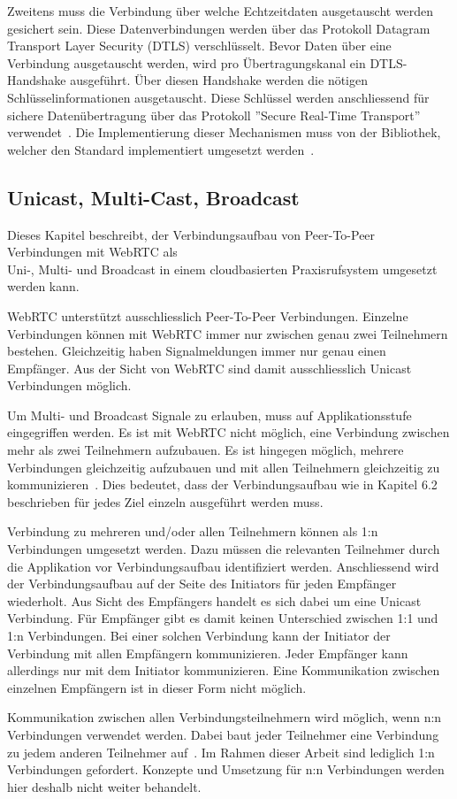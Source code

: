 Zweitens muss die Verbindung über welche Echtzeitdaten ausgetauscht werden gesichert sein.
Diese Datenverbindungen werden über das Protokoll Datagram Transport Layer Security (DTLS) verschlüsselt.
Bevor Daten über eine Verbindung ausgetauscht werden, wird pro Übertragungskanal ein DTLS-Handshake ausgeführt.
Über diesen Handshake werden die nötigen Schlüsselinformationen ausgetauscht.
Diese Schlüssel werden anschliessend für sichere Datenübertragung über das Protokoll ''Secure Real-Time Transport'' verwendet~\cite{rfc_8827_webRTC_SecurityArchitecture}.
Die Implementierung dieser Mechanismen muss von der Bibliothek, welcher den Standard implementiert umgesetzt werden~\cite{webrtc_spec}.

\subsection{Unicast, Multi-Cast, Broadcast}

Dieses Kapitel beschreibt, der Verbindungsaufbau von Peer-To-Peer Verbindungen mit WebRTC als \\Uni-, Multi- und Broadcast in einem cloudbasierten Praxisrufsystem umgesetzt werden kann.

WebRTC unterstützt ausschliesslich Peer-To-Peer Verbindungen.
Einzelne Verbindungen können mit WebRTC immer nur zwischen genau zwei Teilnehmern bestehen.
Gleichzeitig haben Signalmeldungen immer nur genau einen Empfänger.
Aus der Sicht von WebRTC sind damit ausschliesslich Unicast Verbindungen möglich.

Um Multi- und Broadcast Signale zu erlauben, muss auf Applikationsstufe eingegriffen werden.
Es ist mit WebRTC nicht möglich, eine Verbindung zwischen mehr als zwei Teilnehmern aufzubauen.
Es ist hingegen möglich, mehrere Verbindungen gleichzeitig aufzubauen und mit allen Teilnehmern gleichzeitig zu kommunizieren~\cite{webrtc_mesh}.
Dies bedeutet, dass der Verbindungsaufbau wie in Kapitel 6.2 beschrieben für jedes Ziel einzeln ausgeführt werden muss.

Verbindung zu mehreren und/oder allen Teilnehmern können als 1:n Verbindungen umgesetzt werden.
Dazu müssen die relevanten Teilnehmer durch die Applikation vor Verbindungsaufbau identifiziert werden.
Anschliessend wird der Verbindungsaufbau auf der Seite des Initiators für jeden Empfänger wiederholt.
Aus Sicht des Empfängers handelt es sich dabei um eine Unicast Verbindung.
Für Empfänger gibt es damit keinen Unterschied zwischen 1:1 und 1:n Verbindungen.
Bei einer solchen Verbindung kann der Initiator der Verbindung mit allen Empfängern kommunizieren.
Jeder Empfänger kann allerdings nur mit dem Initiator kommunizieren.
Eine Kommunikation zwischen einzelnen Empfängern ist in dieser Form nicht möglich.

Kommunikation zwischen allen Verbindungsteilnehmern wird möglich, wenn n:n Verbindungen verwendet werden.
Dabei baut jeder Teilnehmer eine Verbindung zu jedem anderen Teilnehmer auf~\cite{webrtc_mesh}.
Im Rahmen dieser Arbeit sind lediglich 1:n Verbindungen gefordert.
Konzepte und Umsetzung für n:n Verbindungen werden hier deshalb nicht weiter behandelt.

\clearpage

